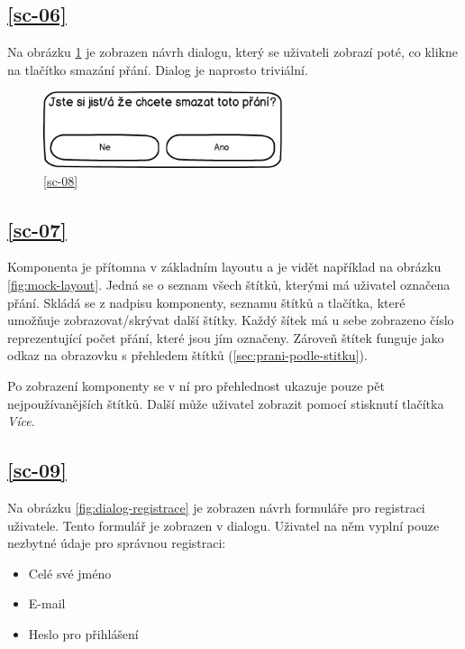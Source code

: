 \subsection{\ref{sc-06}}
Na obrázku \ref{fig:dialog-mazani-prani} je zobrazen návrh dialogu, který se uživateli zobrazí poté, co klikne na tlačítko smazání přání. Dialog je naprosto triviální.

\begin{figure}[htb]
\begin{center}
\includegraphics[width=70mm]{./pictures/mock/dialog-mazani-prani.png}
\caption{\ref{sc-08}}
\label{fig:dialog-mazani-prani}
\end{center}
\end{figure}

\subsection{\ref{sc-07}}
Komponenta je přítomna v základním layoutu a je vidět například na obrázku \ref{fig:mock-layout}. Jedná se o seznam všech štítků, kterými má uživatel označena přání. Skládá se z nadpisu komponenty, seznamu štítků a tlačítka, které umožňuje zobrazovat/skrývat další štítky. Každý šítek má u sebe zobrazeno číslo reprezentující počet přání, které jsou jím označeny. Zároveň štítek funguje jako odkaz na obrazovku s přehledem štítků (\ref{sec:prani-podle-stitku}).

Po zobrazení komponenty se v ní pro přehlednost ukazuje pouze pět nejpoužívanějších štítků. Další může uživatel zobrazit pomocí stisknutí tlačítka \emph{Více}.

\subsection{\ref{sc-09}}
Na obrázku \ref{fig:dialog-registrace} je zobrazen návrh formuláře pro registraci uživatele. Tento formulář je zobrazen v dialogu. Uživatel na něm vyplní pouze nezbytné údaje pro správnou registraci:
\begin{itemize}
\item Celé své jméno
\item E-mail
\item Heslo pro přihlášení
\end{itemize} 


